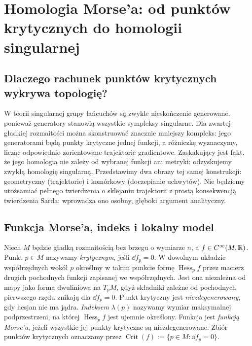 \chapter{Homologia Morse'a: od punktów krytycznych do homologii singularnej}
\label{ch:morse-v10}

\section{Dlaczego rachunek punktów krytycznych wykrywa topologię?}
W teorii singularnej grupy łańcuchów są zwykle nieskończenie generowane,
ponieważ generatory stanowią wszystkie sympleksy singularne. Dla zwartej
gładkiej rozmaitości można skonstruować znacznie mniejszy kompleks:
jego generatorami będą punkty krytyczne jednej funkcji, a różniczkę
wyznaczymy, licząc odpowiednio zorientowane trajektorie gradientowe.
Zaskakujący jest fakt, że jego homologia nie zależy od wybranej
funkcji ani metryki: odzyskujemy zwykłą homologię singularną.
Przedstawimy dwa obrazy tej samej konstrukcji: geometryczny (trajektorie)
i komórkowy (doczepianie uchwytów). Nie będziemy utożsamiać pełnego
twierdzenia o sklejaniu trajektorii z prostą konsekwencją twierdzenia
Sarda: wprowadza ono osobny, głęboki argument analityczny.

\section{Funkcja Morse'a, indeks i lokalny model}
\begin{definicja}
Niech $M$ będzie gładką rozmaitością bez brzegu o wymiarze $n$,
a $f\in C^\infty(M,\mathbb{R})$. Punkt $p\in M$ nazywamy \emph{krytycznym}, jeśli $\dd f_p=0$.
W dowolnym układzie współrzędnych wokół $p$ określmy w takim
punkcie formę $\operatorname{Hess}_p f$ przez macierz drugich
pochodnych funkcji zapisanej we współrzędnych.
Jest ona niezależna od mapy jako forma dwuliniowa na $T_pM$, gdyż
składniki zależne od pochodnych pierwszego rzędu znikają dla $\dd f_p=0$.
Punkt krytyczny jest \emph{niezdegenerowany}, gdy hesjan nie ma jądra.
\emph{Indeksem} $\lambda(p)$ nazywamy wymiar maksymalnej podprzestrzeni,
na której $\operatorname{Hess}_pf$ jest ujemnie określony.
Funkcja jest \emph{funkcją Morse'a}, jeżeli wszystkie jej punkty
krytyczne są niezdegenerowane.
Zbiór punktów krytycznych oznaczamy przez
$\operatorname{Crit}(f):=\{p\in M:\dd f_p=0\}$.
\end{definicja}

